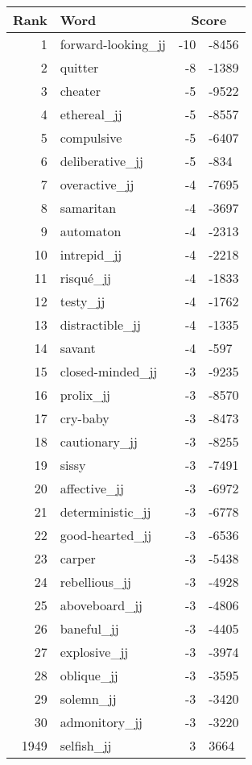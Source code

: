 \begin{longtable}[!htbp]{| rlr@{.}l |}
    \hline
    \textbf{Rank} & \textbf{Word} & \multicolumn{2}{c|}{\textbf{Score}} \\
    \hline
    \endhead
    1 & forward-looking\_jj & -10 & -8456 \\
    2 & quitter & -8 & -1389 \\
    3 & cheater & -5 & -9522 \\
    4 & ethereal\_jj & -5 & -8557 \\
    5 & compulsive & -5 & -6407 \\
    6 & deliberative\_jj & -5 & -834 \\
    7 & overactive\_jj & -4 & -7695 \\
    8 & samaritan & -4 & -3697 \\
    9 & automaton & -4 & -2313 \\
    10 & intrepid\_jj & -4 & -2218 \\
    11 & risqué\_jj & -4 & -1833 \\
    12 & testy\_jj & -4 & -1762 \\
    13 & distractible\_jj & -4 & -1335 \\
    14 & savant & -4 & -597 \\
    15 & closed-minded\_jj & -3 & -9235 \\
    16 & prolix\_jj & -3 & -8570 \\
    17 & cry-baby & -3 & -8473 \\
    18 & cautionary\_jj & -3 & -8255 \\
    19 & sissy & -3 & -7491 \\
    20 & affective\_jj & -3 & -6972 \\
    21 & deterministic\_jj & -3 & -6778 \\
    22 & good-hearted\_jj & -3 & -6536 \\
    23 & carper & -3 & -5438 \\
    24 & rebellious\_jj & -3 & -4928 \\
    25 & aboveboard\_jj & -3 & -4806 \\
    26 & baneful\_jj & -3 & -4405 \\
    27 & explosive\_jj & -3 & -3974 \\
    28 & oblique\_jj & -3 & -3595 \\
    29 & solemn\_jj & -3 & -3420 \\
    30 & admonitory\_jj & -3 & -3220 \\
    1949 & selfish\_jj & 3 & 3664 \\

\end{longtable}

